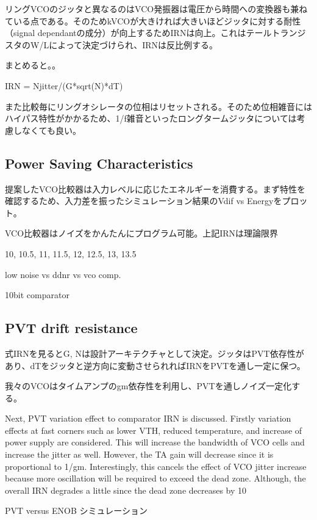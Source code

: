 \documentclass[letterpaper, 10 pt, conference]{ieeeconf}  %
\begin{document}
リングVCOのジッタと異なるのはVCO発振器は電圧から時間への変換器も兼ねている点である。そのためkVCOが大きければ大きいほどジッタに対する耐性（signal dependantの成分）が向上するためIRNは向上。これはテールトランジスタのW/Lによって決定づけられ、IRNは反比例する。

まとめると。。

IRN = Njitter/(G*sqrt(N)*dT)

また比較毎にリングオシレータの位相はリセットされる。そのため位相雑音にはハイパス特性がかかるため、1/f雑音といったロングタームジッタについては考慮しなくても良い。

\subsection{Power Saving Characteristics}
提案したVCO比較器は入力レベルに応じたエネルギーを消費する。まず特性を確認するため、入力差を振ったシミュレーション結果のVdif vs Energyをプロット。

VCO比較器はノイズをかんたんにプログラム可能。上記IRNは理論限界

10, 10.5, 11, 11.5, 12, 12.5, 13, 13.5

low noise vs ddnr vs vco comp.

10bit comparator

\subsection{PVT drift resistance}
式IRNを見るとG, Nは設計アーキテクチャとして決定。ジッタはPVT依存性があり、dTをジッタと逆方向に変動させられればIRNをPVTを通し一定に保つ。

我々のVCOはタイムアンプのgm依存性を利用し、PVTを通しノイズ一定化する。

Next, PVT variation effect to comparator IRN is discussed. Firstly variation effects at fast corners such as lower VTH, reduced temperature, and increase of power supply are considered. This will increase the bandwidth of VCO cells and increase the jitter as well. However, the TA gain will decrease since it is proportional to 1/gm. Interestingly, this cancels the effect of VCO jitter increase because more oscillation will be required to exceed the dead zone. Although, the overall IRN degrades a little since the dead zone decreases by 10%

PVT versus ENOB シミュレーション
\end{document}
